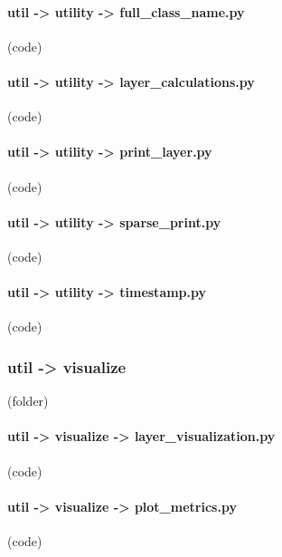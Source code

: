 \begin{myparindent}{0pt}
\noindent\paragraph[full\_class\_name.py]{util -> utility -> full\_class\_name.py} (code)

\noindent\paragraph[layer\_calculations.py]{util -> utility -> layer\_calculations.py} (code)

\noindent\paragraph[print\_layer.py]{util -> utility -> print\_layer.py} (code)

\noindent\paragraph[sparse\_print.py]{util -> utility -> sparse\_print.py} (code)

\noindent\paragraph[timestamp.py]{util -> utility -> timestamp.py} (code)

\noindent\subsubsection[visualize]{util -> visualize} (folder)
\noindent\paragraph[layer\_visualization.py]{util -> visualize -> layer\_visualization.py} (code)

\noindent\paragraph[plot\_metrics.py]{util -> visualize -> plot\_metrics.py} (code)

\end{myparindent}
